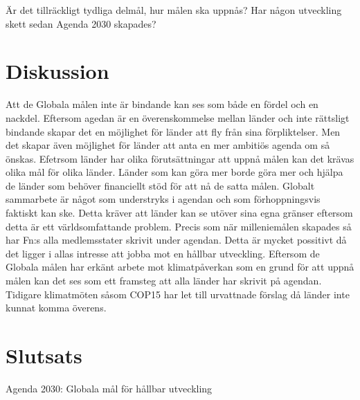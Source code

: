 \documentclass{report}
\begin{document}
Är det tillräckligt tydliga delmål, hur målen ska uppnås?
Har någon utveckling skett sedan Agenda 2030 skapades?



\newpage
\section{Diskussion}
Att de Globala målen inte är bindande kan ses som både en fördel och en nackdel. Eftersom agedan är en överenskommelse mellan länder och inte rättsligt bindande skapar det en möjlighet för länder att fly från sina förpliktelser. Men det skapar även möjlighet för länder att anta en mer ambitiös agenda om så önskas. \cite{critique} Efetrsom länder har olika förutsättningar att uppnå målen kan det krävas olika mål för olika länder. Länder som kan göra mer borde göra mer och hjälpa de länder som behöver financiellt stöd för att nå de satta målen. Globalt sammarbete är något som understryks i agendan och som förhoppningsvis faktiskt kan ske. Detta kräver att länder kan se utöver sina egna gränser eftersom detta är ett världsomfattande problem. Precis som när milleniemålen skapades så har Fn:s alla medlemsstater skrivit under agendan. Detta är mycket possitivt då det ligger i allas intresse att jobba mot en hållbar utveckling. Eftersom de Globala målen har erkänt arbete mot klimatpåverkan som en grund för att uppnå målen kan det ses som ett framsteg att alla länder har skrivit på agendan. Tidigare klimatmöten såsom COP15 har let till urvattnade förslag då länder inte kunnat komma överens. 


\newpage
\section{Slutsats}
Agenda 2030: Globala mål för hållbar utveckling 

 
\end{document}
